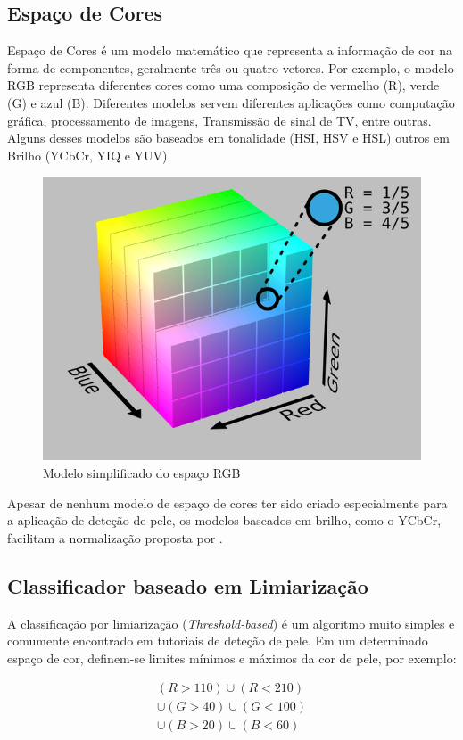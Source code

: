 \documentclass[conference]{IEEEtran}
\begin{document}
\subsection{Espaço de Cores}

Espaço de Cores é um modelo matemático que representa a informação de cor na forma de componentes, geralmente três ou quatro vetores. Por exemplo, o modelo RGB representa diferentes cores como uma composição de vermelho (R), verde (G) e azul (B). Diferentes modelos servem diferentes aplicações como computação gráfica, processamento de imagens, Transmissão de sinal de TV, entre outras. Alguns desses modelos são baseados em tonalidade (HSI, HSV e HSL) outros em Brilho (YCbCr, YIQ e YUV)\cite{kolkur}. 

\begin{figure}[ht!]
\begin{center}
\includegraphics[width=.55\columnwidth]{RGB_Cube.png}
\caption{Modelo simplificado do espaço RGB\cite{wikipedia}}
\end{center}
\end{figure}

Apesar de nenhum modelo de espaço de cores ter sido criado especialmente para a aplicação de deteção de pele, os modelos baseados em brilho, como o YCbCr, facilitam a normalização proposta por \cite{yang}.

\subsection{Classificador baseado em Limiarização}
A classificação por limiarização (\textit{Threshold-based}) é um algoritmo muito simples e comumente encontrado em tutoriais de deteção de pele\cite{pysearch}. Em um determinado espaço de cor, definem-se limites mínimos e máximos da cor de pele, por exemplo:

\begin{equation}
\begin{split}
(R > 110) \cup(R < 210) \\
 \cup (G > 40) \cup (G < 100) \\
 \cup (B > 20) \cup (B < 60)
\end{split}
\end{equation}
\end{document}
